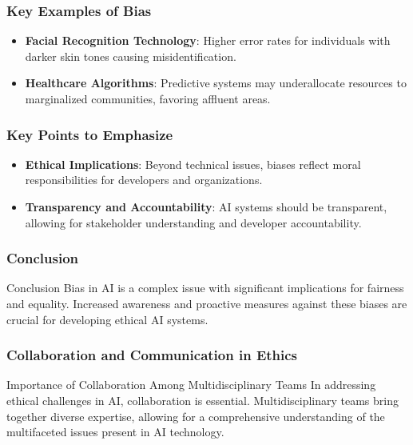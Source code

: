 \documentclass[aspectratio=169]{beamer}
\begin{document}
\begin{frame}[fragile]
    \frametitle{Key Examples of Bias}
    \begin{itemize}
        \item \textbf{Facial Recognition Technology}: Higher error rates for individuals with darker skin tones causing misidentification.
        \item \textbf{Healthcare Algorithms}: Predictive systems may underallocate resources to marginalized communities, favoring affluent areas.
    \end{itemize}
\end{frame}

\begin{frame}[fragile]
    \frametitle{Key Points to Emphasize}
    \begin{itemize}
        \item \textbf{Ethical Implications}: Beyond technical issues, biases reflect moral responsibilities for developers and organizations.
        \item \textbf{Transparency and Accountability}: AI systems should be transparent, allowing for stakeholder understanding and developer accountability.
    \end{itemize}
\end{frame}

\begin{frame}[fragile]
    \frametitle{Conclusion}
    \begin{block}{Conclusion}
        Bias in AI is a complex issue with significant implications for fairness and equality. Increased awareness and proactive measures against these biases are crucial for developing ethical AI systems.
    \end{block}
\end{frame}

\begin{frame}[fragile]
    \frametitle{Collaboration and Communication in Ethics}
    \begin{block}{Importance of Collaboration Among Multidisciplinary Teams}
        In addressing ethical challenges in AI, collaboration is essential. 
        Multidisciplinary teams bring together diverse expertise, allowing for a comprehensive understanding of the multifaceted issues present in AI technology.
    \end{block}
\end{frame}
\end{document}
